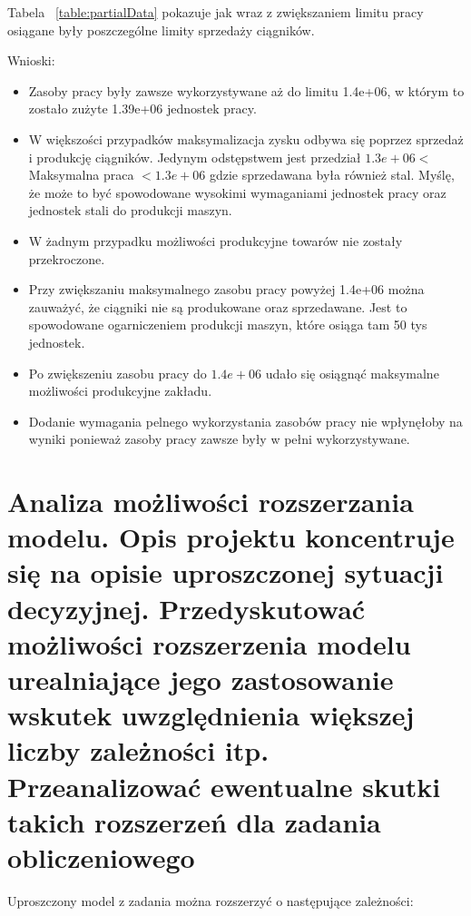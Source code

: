 \documentclass{article}
\begin{document}
Tabela ~\ref{table:partialData} pokazuje jak wraz z zwiększaniem limitu pracy osiągane były poszczególne limity sprzedaży ciągników.

Wnioski:

\begin{itemize}
    \item Zasoby pracy były zawsze wykorzystywane aż do limitu 1.4e+06, w którym to zostało zużyte 1.39e+06 jednostek pracy. 
    \item W większości przypadków maksymalizacja zysku odbywa się poprzez sprzedaż i produkcję ciągników. Jedynym odstępstwem jest przedział $1.3e+06 < $ Maksymalna praca $ < 1.3e+06$ gdzie sprzedawana była również stal. 
      Myślę, że może to być spowodowane wysokimi wymaganiami jednostek pracy oraz jednostek stali do produkcji maszyn. 
    \item W żadnym przypadku możliwości produkcyjne towarów nie zostały przekroczone.
    \item Przy zwiększaniu maksymalnego zasobu pracy powyżej 1.4e+06 można zauważyć, że ciągniki nie są produkowane oraz sprzedawane. Jest to spowodowane ogarniczeniem produkcji maszyn, które osiąga tam 50 tys jednostek.
    \item Po zwiększeniu zasobu pracy do $1.4e+06$ udało się osiągnąć maksymalne możliwości produkcyjne zakładu.
    \item Dodanie wymagania pelnego wykorzystania zasobów pracy nie wpłynęłoby na wyniki ponieważ zasoby pracy zawsze były w pełni wykorzystywane.
\end{itemize}

\section{Analiza  możliwości  rozszerzania  modelu.  Opis  projektu  koncentruje  się  na  opisie uproszczonej  sytuacji  decyzyjnej.  Przedyskutować  możliwości  rozszerzenia  modelu urealniające  jego  zastosowanie  wskutek  uwzględnienia  większej  liczby  zależności  itp. Przeanalizować ewentualne skutki takich rozszerzeń dla zadania obliczeniowego}

Uproszczony model z zadania można rozszerzyć o następujące zależności:
\end{document}
